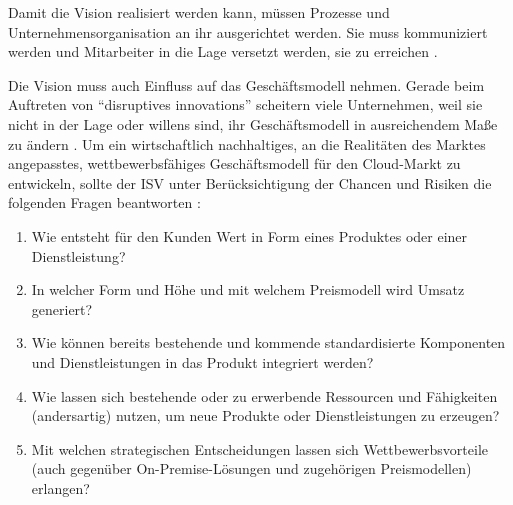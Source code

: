 Damit die Vision realisiert werden kann, müssen Prozesse und 
Unternehmensorganisation an ihr ausgerichtet werden. Sie muss kommuniziert 
werden und Mitarbeiter in die Lage versetzt werden, sie zu erreichen 
.

Die Vision muss auch Einfluss auf das Geschäftsmodell nehmen. Gerade beim 
Auftreten von "`disruptives innovations"' scheitern viele Unternehmen, 
weil sie nicht in der Lage oder willens sind, ihr Geschäftsmodell in 
ausreichendem Maße zu ändern 
. Um ein 
wirtschaftlich nachhaltiges, an die Realitäten des Marktes angepasstes, 
wettbewerbsfähiges Geschäftsmodell für den Cloud-Markt zu entwickeln, sollte 
der ISV unter Berücksichtigung der Chancen und Risiken die folgenden Fragen 
beantworten :
\begin{enumerate}
	\item Wie entsteht für den Kunden Wert in Form eines Produktes oder 
		einer Dienstleistung?
	\item In welcher Form und Höhe und mit welchem Preismodell wird Umsatz 
generiert? 
	\item Wie können bereits bestehende und kommende standardisierte 
Komponenten und Dienstleistungen in das Produkt integriert werden?
	\item Wie lassen sich bestehende oder zu erwerbende Ressourcen und 
Fähigkeiten (andersartig) nutzen, um neue Produkte oder Dienstleistungen zu 
erzeugen?
	\item Mit welchen strategischen Entscheidungen lassen sich 
Wettbewerbsvorteile (auch gegenüber On-Premise-Lösungen und 
zugehörigen Preismodellen) erlangen?
\end{enumerate}

\begin{comment}
Aus \citeflow{the_power_of_vision}:
\begin{itemize}
	\item Notwendigkeiten um Vision zu realisieren: \\
	\begin{itemize}
		\item communicating the vision
		\item aligning organizational processes and systems to suit the 
vision
		\item empowering others to act to achieve the vision
		\item motivating staff
	\end{itemize}
	\item Charakterisitika eng mit Unternehmenserfolg verbunden


\end{itemize}
\end{comment}


